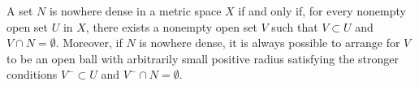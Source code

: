 A set $N$ is nowhere dense in a metric space $X$ if and only if, for every nonempty open set $U$ in $X$, there exists a nonempty open set $V$ such that $V \subset U$ and $V \cap N = \emptyset$. Moreover, if $N$ is nowhere dense, it is always possible to arrange for $V$ to be an open ball with arbitrarily small positive radius satisfying the stronger conditions $V^- \subset U$ and $V^- \cap N = \emptyset$.
